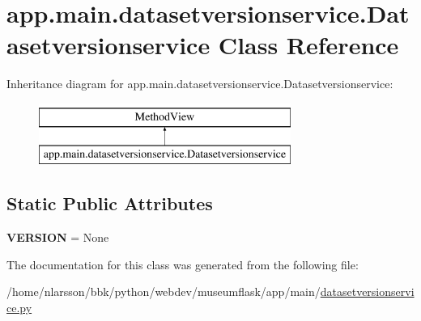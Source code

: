 \hypertarget{classapp_1_1main_1_1datasetversionservice_1_1Datasetversionservice}{}\section{app.\+main.\+datasetversionservice.\+Datasetversionservice Class Reference}
\label{classapp_1_1main_1_1datasetversionservice_1_1Datasetversionservice}
Inheritance diagram for app.\+main.\+datasetversionservice.\+Datasetversionservice\+:\begin{figure}[H]
\begin{center}
\leavevmode
\includegraphics[height=2.000000cm]{classapp_1_1main_1_1datasetversionservice_1_1Datasetversionservice}
\end{center}
\end{figure}
\subsection*{Static Public Attributes}
\begin{DoxyCompactItemize}
\item 
\mbox{\label{classapp_1_1main_1_1datasetversionservice_1_1Datasetversionservice_aad5d55559fef770b6bac27042903cff2}} 
{\bfseries V\+E\+R\+S\+I\+ON} = None
\end{DoxyCompactItemize}


The documentation for this class was generated from the following file\+:\begin{DoxyCompactItemize}
\item 
/home/nlarsson/bbk/python/webdev/museumflask/app/main/\mbox{\hyperlink{datasetversionservice_8py}{datasetversionservice.\+py}}\end{DoxyCompactItemize}
